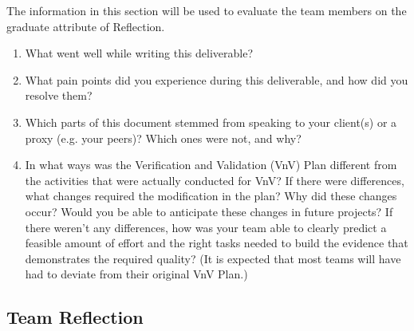 \documentclass[12pt, titlepage]{article}
\begin{document}
The information in this section will be used to evaluate the team members on the
graduate attribute of Reflection.



\begin{enumerate}
  \item What went well while writing this deliverable? 
  \item What pain points did you experience during this deliverable, and how
    did you resolve them?
  \item Which parts of this document stemmed from speaking to your client(s) or
  a proxy (e.g. your peers)? Which ones were not, and why?
  \item In what ways was the Verification and Validation (VnV) Plan different
  from the activities that were actually conducted for VnV?  If there were
  differences, what changes required the modification in the plan?  Why did
  these changes occur?  Would you be able to anticipate these changes in future
  projects?  If there weren't any differences, how was your team able to clearly
  predict a feasible amount of effort and the right tasks needed to build the
  evidence that demonstrates the required quality?  (It is expected that most
  teams will have had to deviate from their original VnV Plan.)
\end{enumerate}

\subsection*{Team Reflection}
\end{document}
